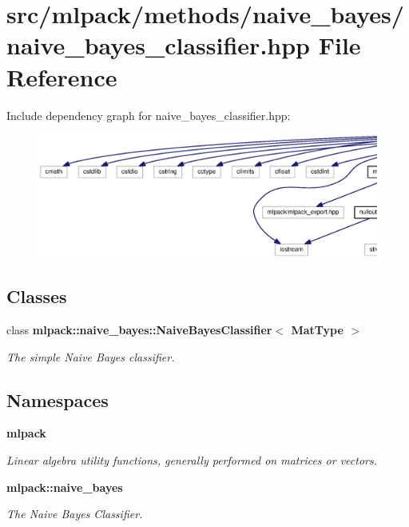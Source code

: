 \section{src/mlpack/methods/naive\+\_\+bayes/naive\+\_\+bayes\+\_\+classifier.hpp File Reference}
\label{naive__bayes__classifier_8hpp}
Include dependency graph for naive\+\_\+bayes\+\_\+classifier.\+hpp\+:
\nopagebreak
\begin{figure}[H]
\begin{center}
\leavevmode
\includegraphics[width=350pt]{naive__bayes__classifier_8hpp__incl}
\end{center}
\end{figure}
\subsection*{Classes}
\begin{DoxyCompactItemize}
\item 
class {\bf mlpack\+::naive\+\_\+bayes\+::\+Naive\+Bayes\+Classifier$<$ Mat\+Type $>$}
\begin{DoxyCompactList}\small\item\em The simple Naive Bayes classifier. \end{DoxyCompactList}\end{DoxyCompactItemize}
\subsection*{Namespaces}
\begin{DoxyCompactItemize}
\item 
 {\bf mlpack}
\begin{DoxyCompactList}\small\item\em Linear algebra utility functions, generally performed on matrices or vectors. \end{DoxyCompactList}\item 
 {\bf mlpack\+::naive\+\_\+bayes}
\begin{DoxyCompactList}\small\item\em The Naive Bayes Classifier. \end{DoxyCompactList}\end{DoxyCompactItemize}


